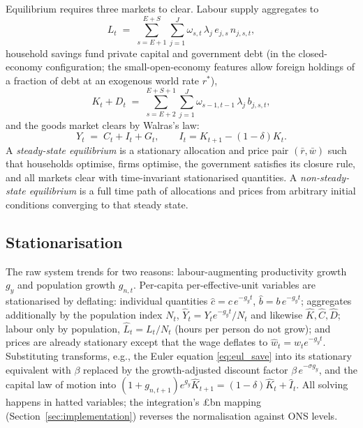 Equilibrium requires three markets to clear. Labour supply aggregates to
\begin{equation}
L_t \;=\; \sum_{s=E+1}^{E+S}\sum_{j=1}^{J} \omega_{s,t}\,\lambda_j\, e_{j,s}\, n_{j,s,t},
\end{equation}
household savings fund private capital and government debt (in the closed-economy configuration; the small-open-economy features allow foreign holdings of a fraction of debt at an exogenous world rate $r^*$),
\begin{equation}
K_t + D_t \;=\; \sum_{s=E+2}^{E+S+1}\sum_{j=1}^{J} \omega_{s-1,t-1}\,\lambda_j\, b_{j,s,t},
\end{equation}
and the goods market clears by Walras's law:
\begin{equation}
Y_t \;=\; C_t + I_t + G_t, \qquad I_t = K_{t+1} - (1-\delta)K_t .
\end{equation}
A \emph{steady-state equilibrium} is a stationary allocation and price pair $(\bar{r},\bar{w})$ such that households optimise, firms optimise, the government satisfies its closure rule, and all markets clear with time-invariant stationarised quantities. A \emph{non-steady-state equilibrium} is a full time path of allocations and prices from arbitrary initial conditions converging to that steady state.

\subsection{Stationarisation}
\label{subsec:stationarisation}

The raw system trends for two reasons: labour-augmenting productivity growth $g_y$ and population growth $g_{n,t}$. Per-capita per-effective-unit variables are stationarised by deflating: individual quantities $\hat{c} = c\,e^{-g_y t}$, $\hat{b} = b\,e^{-g_y t}$; aggregates additionally by the population index $N_t$, $\hat{Y}_t = Y_t e^{-g_y t}/N_t$ and likewise $\hat{K},\hat{C},\hat{D}$; labour only by population, $\hat{L}_t = L_t/N_t$ (hours per person do not grow); and prices are already stationary except that the wage deflates to $\hat{w}_t = w_t e^{-g_y t}$. Substituting transforms, e.g., the Euler equation \eqref{eq:eul_save} into its stationary equivalent with $\beta$ replaced by the growth-adjusted discount factor $\beta\,e^{-\sigma g_y}$, and the capital law of motion into $(1+g_{n,t+1})e^{g_y}\hat{K}_{t+1} = (1-\delta)\hat{K}_t + \hat{I}_t$. All solving happens in hatted variables; the integration's \pounds bn mapping (Section~\ref{sec:implementation}) reverses the normalisation against ONS levels.


